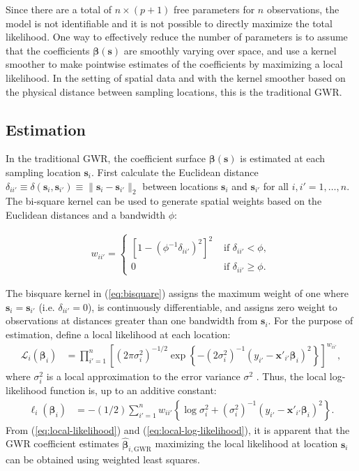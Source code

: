 \documentclass[authoryear, review, 11pt]{elsarticle}
\begin{document}
	Since there are a total of $n \times (p+1)$ free parameters for $n$ observations, the model is not identifiable and it is not possible to directly maximize the total likelihood. One way to effectively reduce the number of parameters is to assume that the coefficients $\bm{\beta}(\bm{s})$ are smoothly varying over space, and use a kernel smoother to make pointwise estimates of the coefficients by maximizing a local likelihood. In the setting of spatial data and with the kernel smoother based on the physical distance between sampling locations, this is the traditional GWR.
		
	\subsection{Estimation}		
	In the traditional GWR, the coefficient surface $\bm{\beta}(\bm{s})$ is estimated at each sampling location $\bm{s}_i$. First calculate the Euclidean distance $\delta_{ii'} \equiv \delta\left(\bm{s}_i, \bm{s}_{i'}\right) \equiv \|\bm{s}_i  -\bm{s}_{i'}\|_2$ between locations $\bm{s}_i$ and $\bm{s}_{i'}$ for all $i, i' = 1, \dots, n$. The bi-square kernel can be used to generate spatial weights based on the Euclidean distances and a bandwidth $\phi$:
	
	\begin{align}\label{eq:bisquare}
		w_{ii'} = \begin{cases} \left[1-\left(\phi^{-1}\delta_{ii'}\right)^2\right]^2 &\mbox{ if } \delta_{ii'} < \phi, \\ 0 &\mbox{ if } \delta_{ii'} \geq \phi. \end{cases}
	\end{align}
	
	The bisquare kernel in (\ref{eq:bisquare}) assigns the maximum weight of one where $\bm{s}_i = \bm{s}_{i'}$ (i.e. $\delta_{ii'}=0$), is continuously differentiable, and assigns zero weight to observations at distances greater than one bandwidth from $\bm{s}_i$. For the purpose of estimation, define a local likelihood at each location:
	\begin{align}\label{eq:local-likelihood}
		\mathcal{L}_i \left(\bm{\beta}_i \right) &= \prod_{i'=1}^n \left[ \left(2 \pi \sigma^2_i  \right)^{-1/2}  \exp\left\{-\left(2 \sigma^2_i\right)^{-1}  \left(y_{i'} - \bm{x}'_{i'} \bm{\beta}_i \right)^2 \right\} \right] ^ {w_{ii'}},
	\end{align}			
	where $\sigma_i^2$ is a local approximation to the error variance $\sigma^2$ \citep{Fotheringham:2002}. Thus, the local log-likelihood function is, up to an additive constant:
	\begin{align}\label{eq:local-log-likelihood}
		\ell_i\left(\bm{\beta}_i\right) &= -(1/2) \sum_{i'=1}^n w_{ii'} \left\{ \log{\sigma^2_i}  + \left(\sigma^2_i\right)^{-1}  \left(y_{i'} - \bm{x}'_{i'} \bm{\beta}_i \right)^2 \right\}.
	\end{align}
	From (\ref{eq:local-likelihood}) and (\ref{eq:local-log-likelihood}), it is apparent that the GWR coefficient estimates $\hat{\bm{\beta}}_{i,\text{GWR}}$ maximizing the local likelihood at location $\bm{s}_i$ can be obtained using weighted least squares. 
	
\end{document}
